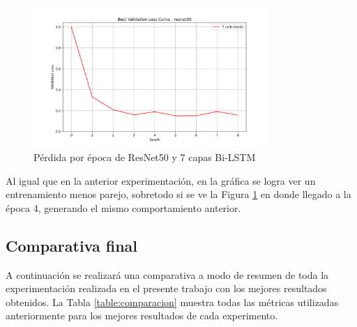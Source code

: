 \begin{figure}[h!] 
    \includegraphics[width=0.8\textwidth]{../graphs/resnet50_best_val_loss.png}
    \centering 
    \caption{Pérdida por época de ResNet50 y 7 capas Bi-LSTM } 
    \label{ResNet50Loss} 
\end{figure}

Al igual que en la anterior experimentación, en la gráfica se logra ver 
un entrenamiento menos parejo, sobretodo si se ve la Figura 
\ref{ResNet50Loss} en donde llegado a la época 4, generando el mismo 
comportamiento anterior.\\

\subsection{Comparativa final}

A continuación se realizará una comparativa a modo de resumen  
de toda la experimentación realizada en el presente trabajo con 
los mejores resultados obtenidos. La Tabla \ref{table:comparacion} 
muestra todas las métricas utilizadas anteriormente para los mejores 
resultados de cada experimento.

